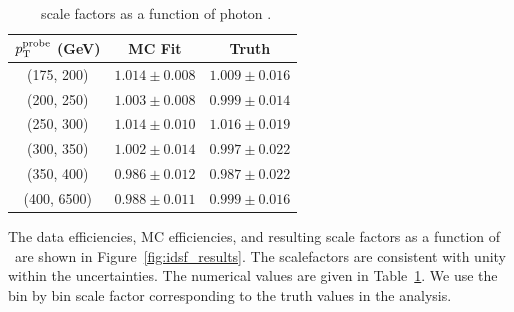 \begin{table}[htbp]
  \begin{center}
    \begin{tabular}{ c|c|c }
      $p_{\mathrm{T}}^{\mathrm{probe}}$ (GeV) & MC Fit & Truth \\\hline
      (175, 200)  & $1.014 \pm 0.008$ & $1.009 \pm 0.016$ \\
      (200, 250)  & $1.003 \pm 0.008$ & $0.999 \pm 0.014$ \\
      (250, 300)  & $1.014 \pm 0.010$ & $1.016 \pm 0.019$ \\
      (300, 350)  & $1.002 \pm 0.014$ & $0.997 \pm 0.022$ \\
      (350, 400)  & $0.986 \pm 0.012$ & $0.987 \pm 0.022$ \\
      (400, 6500)  & $0.988 \pm 0.011$ & $0.999 \pm 0.016$ \\
    \end{tabular}
    \caption{\egamma\ scale factors as a function of photon \pt.}
    \label{tab:idsf_results}
  \end{center}
\end{table}

The data efficiencies, MC efficiencies, and resulting scale factors as a function of \pt\ are shown in Figure~\ref{fig:idsf_results}. 
The scalefactors are consistent with unity within the uncertainties. 
The numerical values are given in Table~\ref{tab:idsf_results}. 
We use the bin by bin scale factor corresponding to the truth values in the analysis. %
